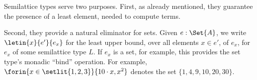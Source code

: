 \begin{enumerate}
  Semilattice types serve two purposes. First, as already mentioned, they
  guarantee the presence of a least element, needed to compute  terms.


  Second, they provide a natural eliminator for sets. Given $e : \Set{A}$, we
  write $\letin{x}{e'}{e_x}$ for the least upper bound, over all elements $x \in
  e'$, of $e_x$, for $e_x$ of some semilattice type $L$. If $e_x$ is a set, for
  example, this provides the set type's monadic ``bind'' operation. For example,
  $\forin{x \in \setlit{1,2,3}} \{10 \cdot x, x^2\}$ denotes the set $\{1, 4, 9,
  10, 20, 30\}$.



\end{enumerate}
